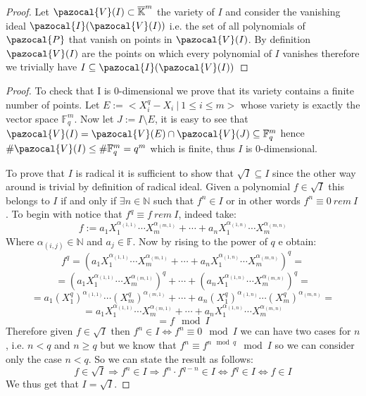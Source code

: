 \documentclass[11pt,a4paper]{report}
\theoremstyle{plain}
\theoremstyle{definition}
\newcommand{\I}{\pazocal{I}}
\newcommand{\V}{\pazocal{V}}
\begin{document}
\begin{ex-hand}[3.5.2]
\end{ex-hand}
\begin{proof}
	Let $\V(I) \subset \overline{\mathbb{K}}^m$ the variety of $I$ and consider the vanishing ideal $\I(\V(I))$ i.e. the set of all polynomials of $\pazocal{P}$ that vanish on points in $\V(I)$. By definition $\V(I)$ are the points on which every polynomial of $I$ vanishes therefore we trivially have $I \subseteq \I(\V(I))$
\end{proof}

\begin{thm-hand}[3.1.4]
\end{thm-hand}
\begin{proof}
	To check that I is 0-dimensional we prove that its variety contains a finite number of points. Let $E := <X_i^q - X_i\ |\ 1 \le i \le m>$ whose variety is exactly the vector space $\mathbb{F}_q^m$. Now let $J := I \setminus E$, it is easy to see that $\V(I) = \V(E) \cap \V(J) \subseteq \mathbb{F}_q^m$ hence $\#\V(I) \le \#\mathbb{F}_q^m = q^m$ which is finite, thus $I$ is 0-dimensional.
	
	To prove that $I$ is radical it is sufficient to show that $\sqrt{I} \subseteq I$ since the other way around is trivial by definition of radical ideal. Given a polynomial $f \in \sqrt{I}$ this belongs to $I$ if and only if $\exists n\in \mathbb{N}$ such that $f^n \in I$ or in other words $f^n \equiv 0\ rem\ I$.
	To begin with notice that $f^q \equiv f\ rem\ I$, indeed take:
	\[
		f := a_1X_1^{\alpha_{(1,1)}}\cdots X_m^{\alpha_{(m,1)}} + \cdots + a_n X_1^{\alpha_{(1,n)}}\cdots X_m^{\alpha_{(m,n)}}			
	\]
	Where $\alpha_{(i,j)} \in \mathbb{N}$ and $a_j \in \mathbb{F}$. Now by rising to the power of $q$ e obtain:
		\[
			f^q = (a_1X_1^{\alpha_{(1,1)}}\cdots X_m^{\alpha_{(m,1)}} + \cdots + a_n X_1^{\alpha_{(1,n)}}\cdots X_m^{\alpha_{(m,n)}})^q =
		\]
		\[
			= 	(a_1X_1^{\alpha_{(1,1)}}\cdots X_m^{\alpha_{(m,1)}})^q + \cdots + (a_n X_1^{\alpha_{(1,n)}}\cdots X_m^{\alpha_{(m,n)}})^q = 
		\]
		\[
			= a_1(X_1^q)^{\alpha_{(1,1)}}\cdots (X_m^q)^{\alpha_{(m,1)}} + \cdots + a_n (X_1^q)^{\alpha_{(1,n)}}\cdots (X_m^q)^{\alpha_{(m,n)}} =
		\]
		\[
			= 	a_1X_1^{\alpha_{(1,1)}}\cdots X_m^{\alpha_{(m,1)}} + \cdots + a_n X_1^{\alpha_{(1,n)}}\cdots X_m^{\alpha_{(m,n)}}	
		\]
		\[
		 = f \mod I		
		\]
		Therefore given $f \in \sqrt{I}$ then $f^n \in I \iff f^n \equiv 0 \mod I$ we can have two cases for $n$, i.e. $n < q$ and $n \ge q$ but we know that $f^n \equiv f^{n \mod q} \mod I$ so we can consider only the case $n < q$. 
		So we can state the result as follows:
		\[
			f \in \sqrt{I}	 \Rightarrow f^n \in I \Rightarrow f^n \cdot f^{q-n} \in I \iff f^q \in I \iff f \in I
		\]
		We thus get that $I = \sqrt{I}$.
\end{proof}
\end{document}
